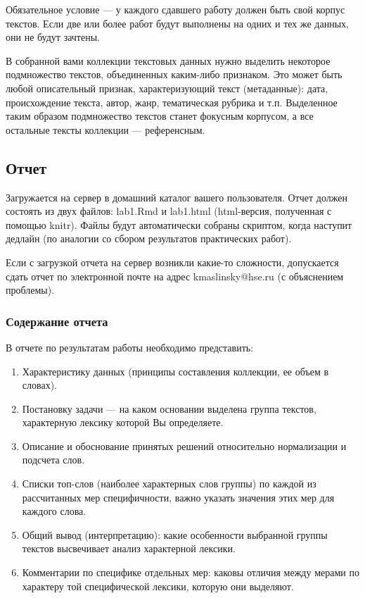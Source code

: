 \documentclass{report}
\begin{document}
Обязательное условие — у каждого сдавшего работу должен быть свой
корпус текстов. Если две или более работ будут выполнены на одних и
тех же данных, они не будут зачтены.

В собранной вами коллекции текстовых данных нужно выделить некоторое
подмножество текстов, объединенных каким-либо признаком. Это может
быть любой описательный признак, характеризующий текст (метаданные):
дата, происхождение текста, автор, жанр, тематическая рубрика и т.п.
Выделенное таким образом подмножество текстов станет фокусным
корпусом, а все остальные тексты коллекции — референсным.

\subsection{Отчет} 

Загружается на сервер в домашний каталог вашего пользователя. Отчет
должен состоять из двух файлов: lab1.Rmd и lab1.html (html-версия,
полученная с помощью knitr). Файлы будут автоматически собраны
скриптом, когда наступит дедлайн (по аналогии со сбором результатов
практических работ).

Если с загрузкой отчета на сервер возникли какие-то сложности,
допускается сдать отчет по электронной почте на адрес
kmaslinsky@hse.ru (с объяснением проблемы).


\subsubsection{Содержание отчета}

В отчете по результатам работы необходимо представить: 

\begin{enumerate}
\item Характеристику данных (принципы составления коллекции, ее объем
  в словах).
\item Постановку задачи — на каком основании выделена группа текстов,
  характерную лексику которой Вы определяете. 
\item Описание и обоснование принятых решений относительно
  нормализации и подсчета слов. 
\item Списки топ-слов (наиболее характерных слов группы) по каждой из
  рассчитанных мер специфичности, важно указать значения этих мер для
  каждого слова.
\item Общий вывод (интерпретацию): какие особенности выбранной группы
  текстов высвечивает анализ характерной лексики.
\item Комментарии по специфике отдельных мер: каковы отличия между
  мерами по характеру той специфической лексики, которую они выделяют.
\end{enumerate}
\end{document}
